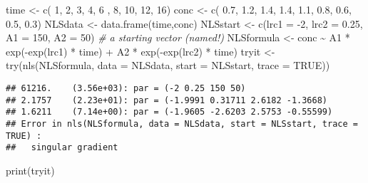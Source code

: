 \documentclass[
]{article}
\newenvironment{Shaded}{\begin{snugshade}}{\end{snugshade}}
\newcommand{\AttributeTok}[1]{\textcolor[rgb]{0.77,0.63,0.00}{#1}}
\newcommand{\CommentTok}[1]{\textcolor[rgb]{0.56,0.35,0.01}{\textit{#1}}}
\newcommand{\ConstantTok}[1]{\textcolor[rgb]{0.00,0.00,0.00}{#1}}
\newcommand{\DecValTok}[1]{\textcolor[rgb]{0.00,0.00,0.81}{#1}}
\newcommand{\FloatTok}[1]{\textcolor[rgb]{0.00,0.00,0.81}{#1}}
\newcommand{\FunctionTok}[1]{\textcolor[rgb]{0.00,0.00,0.00}{#1}}
\newcommand{\NormalTok}[1]{#1}
\newcommand{\OtherTok}[1]{\textcolor[rgb]{0.56,0.35,0.01}{#1}}
\newcommand{\SpecialCharTok}[1]{\textcolor[rgb]{0.00,0.00,0.00}{#1}}
\begin{document}
\begin{Shaded}
\begin{Highlighting}[]
\NormalTok{time }\OtherTok{\textless{}{-}} \FunctionTok{c}\NormalTok{( }\DecValTok{1}\NormalTok{,  }\DecValTok{2}\NormalTok{,  }\DecValTok{3}\NormalTok{,  }\DecValTok{4}\NormalTok{,  }\DecValTok{6}\NormalTok{ , }\DecValTok{8}\NormalTok{, }\DecValTok{10}\NormalTok{, }\DecValTok{12}\NormalTok{, }\DecValTok{16}\NormalTok{)}
\NormalTok{conc }\OtherTok{\textless{}{-}} \FunctionTok{c}\NormalTok{( }\FloatTok{0.7}\NormalTok{, }\FloatTok{1.2}\NormalTok{, }\FloatTok{1.4}\NormalTok{, }\FloatTok{1.4}\NormalTok{, }\FloatTok{1.1}\NormalTok{, }\FloatTok{0.8}\NormalTok{, }\FloatTok{0.6}\NormalTok{, }\FloatTok{0.5}\NormalTok{, }\FloatTok{0.3}\NormalTok{)}
\NormalTok{NLSdata }\OtherTok{\textless{}{-}} \FunctionTok{data.frame}\NormalTok{(time,conc)}
\NormalTok{NLSstart }\OtherTok{\textless{}{-}} \FunctionTok{c}\NormalTok{(}\AttributeTok{lrc1 =} \SpecialCharTok{{-}}\DecValTok{2}\NormalTok{, }\AttributeTok{lrc2 =} \FloatTok{0.25}\NormalTok{, }\AttributeTok{A1 =} \DecValTok{150}\NormalTok{, }\AttributeTok{A2 =} \DecValTok{50}\NormalTok{) }\CommentTok{\# a starting vector (named!)}
\NormalTok{NLSformula }\OtherTok{\textless{}{-}}\NormalTok{ conc }\SpecialCharTok{\textasciitilde{}}\NormalTok{ A1 }\SpecialCharTok{*} \FunctionTok{exp}\NormalTok{(}\SpecialCharTok{{-}}\FunctionTok{exp}\NormalTok{(lrc1) }\SpecialCharTok{*}\NormalTok{ time) }\SpecialCharTok{+}\NormalTok{ A2 }\SpecialCharTok{*} \FunctionTok{exp}\NormalTok{(}\SpecialCharTok{{-}}\FunctionTok{exp}\NormalTok{(lrc2) }\SpecialCharTok{*}\NormalTok{ time)}
\NormalTok{tryit }\OtherTok{\textless{}{-}} \FunctionTok{try}\NormalTok{(}\FunctionTok{nls}\NormalTok{(NLSformula, }\AttributeTok{data =}\NormalTok{ NLSdata, }\AttributeTok{start =}\NormalTok{ NLSstart, }\AttributeTok{trace =} \ConstantTok{TRUE}\NormalTok{))}
\end{Highlighting}
\end{Shaded}

\begin{verbatim}
## 61216.    (3.56e+03): par = (-2 0.25 150 50)
## 2.1757    (2.23e+01): par = (-1.9991 0.31711 2.6182 -1.3668)
## 1.6211    (7.14e+00): par = (-1.9605 -2.6203 2.5753 -0.55599)
## Error in nls(NLSformula, data = NLSdata, start = NLSstart, trace = TRUE) : 
##   singular gradient
\end{verbatim}

\begin{Shaded}
\begin{Highlighting}[]
\FunctionTok{print}\NormalTok{(tryit)}
\end{Highlighting}
\end{Shaded}
\end{document}
